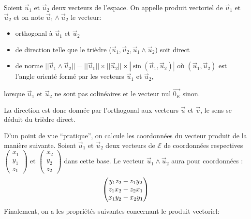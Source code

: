\documentclass[letterpaper,10pt,english]{jupyterBook}
\begin{document}
\sphinxAtStartPar
Soient \(\vec{u}_1\) et \(\vec{u}_2\) deux vecteurs de l’espace. On appelle produit vectoriel de \(\vec{u}_1\) et \(\vec{u}_2\) et on note \(\vec{u}_1 \wedge \vec{u}_2\) le vecteur:
\begin{itemize}
\item {} 
\sphinxAtStartPar
orthogonal à \(\vec{u}_1\) et \(\vec{u}_2\)

\item {} 
\sphinxAtStartPar
de direction telle que le trièdre (\(\vec{u}_1,\vec{u}_2,\vec{u}_1 \wedge \vec{u}_2\)) soit direct

\item {} 
\sphinxAtStartPar
de norme \(||\vec{u}_1 \wedge \vec{u}_2|| = ||\vec{u}_1 || \times || \vec{u}_2|| \times |\sin(\vec{u}_1,\vec{u}_2)|\) où \((\vec{u}_1,\vec{u}_2)\) est l’angle orienté formé par les vecteurs \(\vec{u}_1\) et \(\vec{u}_2\),

\end{itemize}

\sphinxAtStartPar
lorsque  \(\vec{u}_1\) et \(\vec{u}_2\) ne sont pas colinéaires et le vecteur nul \(\vec{0_E}\) sinon.

\sphinxAtStartPar
{} La direction est donc donnée par l’orthogonal aux vecteurs \(\vec{u}\) et \(\vec{v}\), le sens se déduit du trièdre direct.

\sphinxAtStartPar
D’un point de vue “pratique”, on calcule les coordonnées du vecteur produit de la manière suivante. Soient \(\vec{u}_1\) et \(\vec{u}_2\) deux vecteurs de \(\mathcal{E}\) de coordonnées respectives \(\begin{pmatrix}x_1 \\ y_1 \\ z_1\end{pmatrix}\) et \(\begin{pmatrix}x_2 \\ y_2 \\ z_2\end{pmatrix}\) dans cette base. Le vecteur \(\vec{u}_1 \wedge \vec{u}_2\) aura pour coordonnées :
\begin{equation*}
\begin{split}
\begin{pmatrix}
y_1z_2 - z_1y_2\cr
z_1x_2 - z_2 x_1 \cr
x_1y_2 - x_2y_1\cr
\end{pmatrix}
\end{split}
\end{equation*}
\sphinxAtStartPar
Finalement, on a les propriétés suivantes concernant le produit vectoriel:
\end{document}
